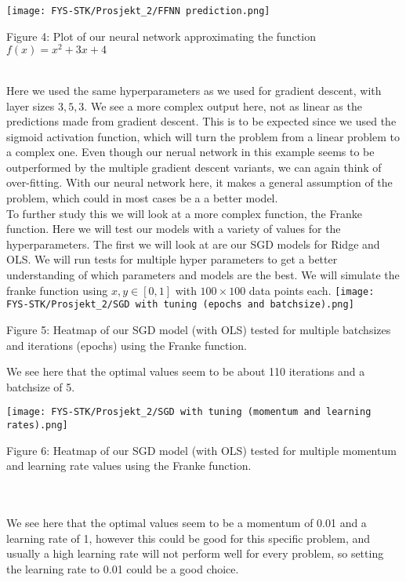 \documentclass[english,notitlepage,reprint,nofootinbib]{revtex4-1}  %
\begin{document}
\texttt{[image: FYS-STK/Prosjekt\_2/FFNN prediction.png]}
\caption{Figure 4: Plot of our neural network approximating the function $f(x) = x^2 + 3x + 4$}
\\
Here we used the same hyperparameters as we used for gradient descent, with layer sizes $3,5,3$. We see a more complex output here, not as linear as the predictions made from gradient descent. This is to be expected since we used the sigmoid activation function, which will turn the problem from a linear problem to a complex one. Even though our nerual network in this example seems to be outperformed by the multiple gradient descent variants, we can again think of over-fitting. With our neural network here, it makes a general assumption of the problem, which could in most cases be a a better model.
\\
To further study this we will look at a more complex function, the Franke function. Here we will test our models with a variety of values for the hyperparameters. The first we will look at are our SGD models for Ridge and OLS. We will run tests for multiple hyper parameters to get a better understanding of which parameters and models are the best. We will simulate the franke function using $x,y \in [0,1]$ with $100 \times 100$ data points each.
\texttt{[image: FYS-STK/Prosjekt\_2/SGD with tuning (epochs and batchsize).png]}
\caption{Figure 5: Heatmap of our SGD model (with OLS) tested for multiple batchsizes and iterations (epochs) using the Franke function.}
We see here that the optimal values seem to be about 110 iterations and a batchsize of 5.

\texttt{[image: FYS-STK/Prosjekt\_2/SGD with tuning (momentum and learning rates).png]}
\caption{Figure 6: Heatmap of our SGD model (with OLS) tested for multiple momentum and learning rate values using the Franke function.} \\
\\
We see here that the optimal values seem to be a momentum of 0.01 and a learning rate of 1, however this could be good for this specific problem, and usually a high learning rate will not perform well for every problem, so setting the learning rate to 0.01 could be a good choice.
\end{document}
